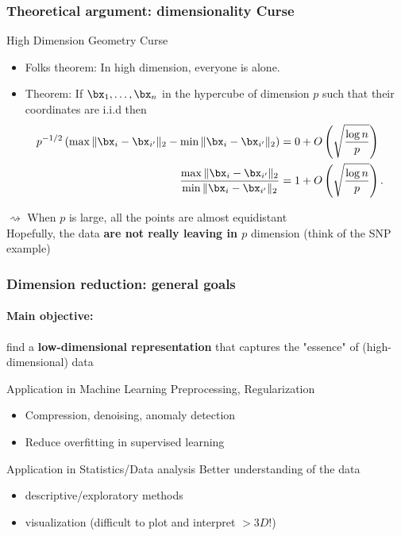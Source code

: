 \documentclass{beamer}\usepackage[]{graphicx}\usepackage[]{color}
\begin{document}
\begin{frame}
\frametitle{Theoretical argument: dimensionality Curse}

\begin{block}{High Dimension Geometry Curse}
\begin{itemize}
\item Folks theorem: In high dimension, everyone is alone.
\item Theorem: If $\bx_1,\ldots, \bx_n$ in the hypercube of dimension $p$  such that their coordinates are i.i.d then
\begin{align*}
\mspace{-20mu} p^{-1/2} \left( \max \|\bx_i-\bx_{i'}\|_2 - \min \|\bx_i-\bx_{i'}\|_2 \right)  &= 0 + O\left(\sqrt{\frac{\log n}{p}}\right)\\
\frac{\max \|\bx_i-\bx_{i'}\|_2}{\min \|\bx_i-\bx_{i'}\|_2} &= 1 + O\left(\sqrt{\frac{\log n}{p}}\right).
\end{align*}
\end{itemize}
\end{block}

  $\rightsquigarrow$ When $p$ is large, all the points are almost equidistant\\

  Hopefully, the data \alert{\bf are not really leaving in $p$} dimension (think of the SNP example)

\end{frame}

\begin{frame}[label=DimensionReduction]
  \frametitle{Dimension reduction: general goals}

  \paragraph{Main objective:} find a \alert{\bf low-dimensional representation} that captures the "essence" of (high-dimensional) data

  \vfill

  \begin{block}{Application in Machine Learning}
  \alert{Preprocessing, Regularization}
  \begin{itemize}
    \item Compression, denoising,  anomaly detection
    \item Reduce overfitting in supervised learning
  \end{itemize}
  \end{block}

\vfill

  \begin{block}{Application in Statistics/Data analysis}
    \alert{Better understanding of the data}
    \begin{itemize}
      \item descriptive/exploratory methods
      \item visualization (difficult to plot and interpret $> 3D$!)
    \end{itemize}
  \end{block}

\end{frame}
\end{document}
